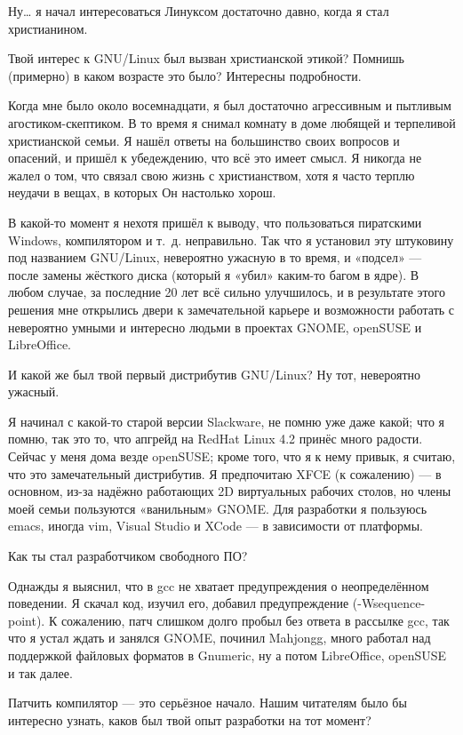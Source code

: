 \documentclass[10pt, a5paper]{article}
\begin{document}
\begin{Parallel}[p]{}{}
{\a Ну… я начал интересоваться Линуксом достаточно давно, когда я стал христианином.

\q Твой интерес к GNU/Linux был вызван христианской этикой? Помнишь (примерно) в каком возрасте это было? Интересны подробности.

\a Когда мне было около восемнадцати, я был достаточно агрессивным и пытливым агостиком-скептиком. В то время я снимал комнату в доме любящей и терпеливой христианской семьи. Я нашёл ответы на большинство своих вопросов и опасений, и пришёл к убедеждению, что всё это имеет смысл. Я никогда не жалел о том, что связал свою жизнь с христианством, хотя я часто терплю неудачи в вещах, в которых Он настолько хорош.

В какой-то момент я нехотя пришёл к выводу, что пользоваться пиратскими Windows, компилятором и т.~д. неправильно. Так что я установил эту штуковину под названием GNU/Linux, невероятно ужасную в то время, и «подсел» — после замены жёсткого диска (который я «убил» каким-то багом в ядре). В любом случае, за последние 20 лет всё сильно улучшилось, и в результате этого решения мне открылись двери к замечательной карьере и возможности работать с невероятно умными и интересно людьми в проектах GNOME, openSUSE и LibreOffice.

\q И какой же был твой первый дистрибутив GNU/Linux? Ну тот, невероятно ужасный.

\a Я начинал с какой-то старой версии Slackware, не помню уже даже какой; что я помню, так это то, что апгрейд на RedHat Linux 4.2 принёс много радости. Сейчас у меня дома везде openSUSE; кроме того, что я к нему привык, я считаю, что это замечательный дистрибутив. Я предпочитаю XFCE (к сожалению) — в основном, из-за надёжно работающих 2D виртуальных рабочих столов, но члены моей семьи пользуются «ванильным» GNOME. Для разработки я пользуюсь emacs, иногда vim, Visual Studio и XCode — в зависимости от платформы.

\q Как ты стал разработчиком свободного ПО?

\a Однажды я выяснил, что в gcc не хватает предупреждения о неопределённом поведении. Я скачал код, изучил его, добавил предупреждение (-Wsequence-point). К сожалению, патч слишком долго пробыл без ответа в рассылке gcc, так что я устал ждать и занялся GNOME, починил Mahjongg, много работал над поддержкой файловых форматов в Gnumeric, ну а потом LibreOffice, openSUSE и так далее.

\q Патчить компилятор — это серьёзное начало. Нашим читателям было бы интересно узнать, каков был твой опыт разработки на тот момент?

}
\end{Parallel}
\end{document}
